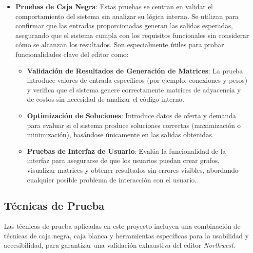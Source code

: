 \documentclass[stu, 12pt, letterpaper, donotrepeattitle, floatsintext, natbib]{apa7}
\begin{document}
\begin{itemize}
    \item \textbf{Pruebas de Caja Negra}: Estas pruebas se centran en validar el comportamiento del sistema sin analizar su lógica interna. Se utilizan para confirmar que las entradas proporcionadas generan las salidas esperadas, asegurando que el sistema cumpla con los requisitos funcionales sin considerar cómo se alcanzan los resultados. Son especialmente útiles para probar funcionalidades clave del editor como:
    \begin{itemize}
        \item \textbf{Validación de Resultados de Generación de Matrices}: La prueba introduce valores de entrada específicos (por ejemplo, conexiones y pesos) y verifica que el sistema genere correctamente matrices de adyacencia y de costos sin necesidad de analizar el código interno.
        \item \textbf{Optimización de Soluciones}: Introduce datos de oferta y demanda para evaluar si el sistema produce soluciones correctas (maximización o minimización), basándose únicamente en las salidas obtenidas.
        \item \textbf{Pruebas de Interfaz de Usuario}: Evalúa la funcionalidad de la interfaz para asegurarse de que los usuarios puedan crear grafos, visualizar matrices y obtener resultados sin errores visibles, abordando cualquier posible problema de interacción con el usuario.
    \end{itemize}
\end{itemize}



\subsection{Técnicas de Prueba}

\noindent Las técnicas de prueba aplicadas en este proyecto incluyen una combinación de técnicas de caja negra, caja blanca y herramientas específicas para la usabilidad y accesibilidad, para garantizar una validación exhaustiva del editor \textit{Northwest}.
\end{document}
